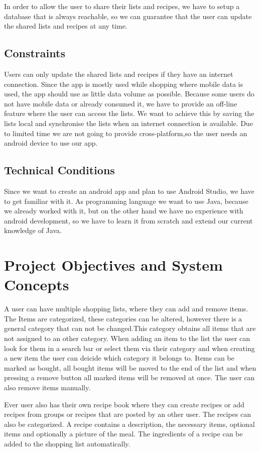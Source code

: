 \documentclass[12pt]{article}
\theoremstyle{definition}
\begin{document}
In order to allow the user to share their lists and recipes, we have to setup a database that is always reachable, so we can guarantee that the user can update the shared lists and recipes at any time.

\subsection{Constraints}
Users can only update the shared lists and recipes if they have an internet connection. Since the app is mostly used while shopping where mobile data is used, the app should use as little data volume as possible. Because some users do not have mobile data or already consumed it, we have to provide an off-line feature where the user can access the lists. We want to achieve this by saving the lists local and synchronise the lists when an internet connection is available.
Due to limited time we are not going to provide cross-platform,so the user needs an android device to use our app.
\subsection{Technical Conditions}
Since we want to create an android app and plan to use Android Studio, we have to get familiar with it. As programming language we want to use Java, because we already worked with it, but on the other hand we have no experience with android development, so we have to learn it from scratch and extend our current knowledge of Java.
\pagebreak

\section{Project Objectives and System Concepts}
A user can have multiple shopping lists, where they can add and remove items. The Items are categorized, these categories can be altered, however there is a general category that can not be changed.This category obtains all items that are not assigned to an other category. When adding an item to the list the user can look for them in a search bar or select them via their category and when creating a new item the user can deicide which category it belongs to. Items can be marked as bought, all bought items will be moved to the end of the list and when pressing a remove button all marked items will be removed at once. The user can also remove items manually.

Ever user also has their own recipe book where they can create recipes or add recipes from groups or recipes that are posted by an other user. The recipes can also be categorized. A recipe contains a description, the necessary items, optional items and optionally a picture of the meal. The ingredients of a recipe can be added to the shopping list automatically.
\end{document}
